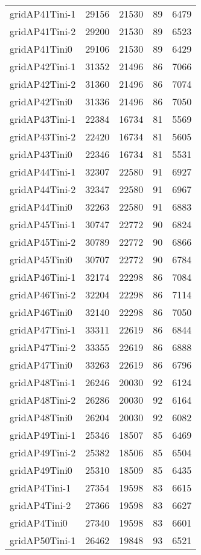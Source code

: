\begin{longtable}{lrrrr}
gridAP41Tini-1 & 29156 & 21530 & 89 & 6479 \\
gridAP41Tini-2 & 29200 & 21530 & 89 & 6523 \\
gridAP41Tini0 & 29106 & 21530 & 89 & 6429 \\
gridAP42Tini-1 & 31352 & 21496 & 86 & 7066 \\
gridAP42Tini-2 & 31360 & 21496 & 86 & 7074 \\
gridAP42Tini0 & 31336 & 21496 & 86 & 7050 \\
gridAP43Tini-1 & 22384 & 16734 & 81 & 5569 \\
gridAP43Tini-2 & 22420 & 16734 & 81 & 5605 \\
gridAP43Tini0 & 22346 & 16734 & 81 & 5531 \\
gridAP44Tini-1 & 32307 & 22580 & 91 & 6927 \\
gridAP44Tini-2 & 32347 & 22580 & 91 & 6967 \\
gridAP44Tini0 & 32263 & 22580 & 91 & 6883 \\
gridAP45Tini-1 & 30747 & 22772 & 90 & 6824 \\
gridAP45Tini-2 & 30789 & 22772 & 90 & 6866 \\
gridAP45Tini0 & 30707 & 22772 & 90 & 6784 \\
gridAP46Tini-1 & 32174 & 22298 & 86 & 7084 \\
gridAP46Tini-2 & 32204 & 22298 & 86 & 7114 \\
gridAP46Tini0 & 32140 & 22298 & 86 & 7050 \\
gridAP47Tini-1 & 33311 & 22619 & 86 & 6844 \\
gridAP47Tini-2 & 33355 & 22619 & 86 & 6888 \\
gridAP47Tini0 & 33263 & 22619 & 86 & 6796 \\
gridAP48Tini-1 & 26246 & 20030 & 92 & 6124 \\
gridAP48Tini-2 & 26286 & 20030 & 92 & 6164 \\
gridAP48Tini0 & 26204 & 20030 & 92 & 6082 \\
gridAP49Tini-1 & 25346 & 18507 & 85 & 6469 \\
gridAP49Tini-2 & 25382 & 18506 & 85 & 6504 \\
gridAP49Tini0 & 25310 & 18509 & 85 & 6435 \\
gridAP4Tini-1 & 27354 & 19598 & 83 & 6615 \\
gridAP4Tini-2 & 27366 & 19598 & 83 & 6627 \\
gridAP4Tini0 & 27340 & 19598 & 83 & 6601 \\
gridAP50Tini-1 & 26462 & 19848 & 93 & 6521 \\

\end{longtable}
